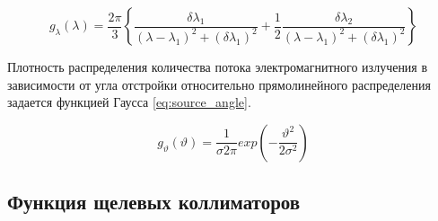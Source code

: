  \begin{equation} \label{eq:source_spectral}
   g_{\lambda} (\lambda) = \frac{2\pi}{3}  \left \{ \frac{\delta\lambda_1}{(\lambda - \lambda_1)^2+
   (\delta \lambda_1)^2} + \frac{1}{2} \frac{\delta\lambda_2}{(\lambda-\lambda_1)^2+(\delta\lambda_1)^2} \right \}
  \end{equation}

  Плотность распределения количества потока электромагнитного излучения в зависимости от угла
  отстройки относительно прямолинейного распределения задается функцией Гаусса \ref{eq:source_angle}.

  \begin{equation} \label{eq:source_angle}
    g_{\vartheta} (\vartheta) = \frac{1}{\sigma 2 \pi} exp  ( -\frac{\vartheta^2}{2\sigma^2} )
   \end{equation}

 \subsection{Функция щелевых коллиматоров}

